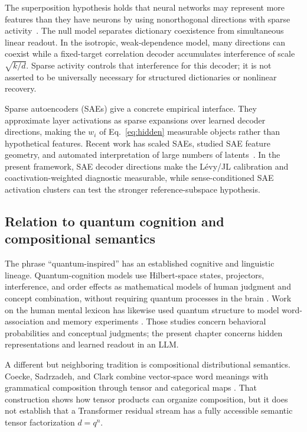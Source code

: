 \documentclass[
  aps,
  reprint,
  superscriptaddress,
  floatfix,
  nofootinbib,
  longbibliography
]{revtex4-2}
\begin{document}
The superposition hypothesis holds that neural networks may represent more
features than they have neurons by using nonorthogonal directions with sparse
activity~\cite{elhage2022superposition,bricken2023monosemanticity}.  The null
model separates dictionary coexistence from simultaneous linear readout.  In
the isotropic, weak-dependence model, many directions can coexist while a
fixed-target correlation decoder accumulates interference of scale
$\sqrt{k/d}$.  Sparse activity controls that interference for this decoder;
it is not asserted to be universally necessary for structured dictionaries or
nonlinear recovery.

Sparse autoencoders (SAEs) give a concrete empirical interface. They
approximate layer activations as sparse expansions over learned decoder
directions, making the $w_i$ of Eq.~\eqref{eq:hidden} measurable
objects rather than hypothetical features. Recent work has scaled SAEs,
studied SAE feature geometry, and automated interpretation of large
numbers of latents~\cite{gao2025scaling,li2025geometry,paulo2025automatically,shu2025survey}. In the
present framework, SAE decoder directions make the L\'evy/JL calibration and
coactivation-weighted diagnostic measurable, while sense-conditioned SAE
activation clusters can test the stronger reference-subspace hypothesis.

\subsection{Relation to quantum cognition and compositional semantics}
\label{sec:related-quantum}

The phrase ``quantum-inspired'' has an established cognitive and linguistic
lineage.  Quantum-cognition models use Hilbert-space states, projectors,
interference, and order effects as mathematical models of human judgment and
concept combination, without requiring quantum processes in the brain
\cite{Busemeyer2012,aerts2005b}.  Work on the human mental lexicon has likewise
used quantum structure to model word-association and memory experiments
\cite{bruza2009lexicon}.  Those studies concern behavioral probabilities and
conceptual judgments; the present chapter concerns hidden representations and
learned readout in an LLM.

A different but neighboring tradition is compositional distributional
semantics.  Coecke, Sadrzadeh, and Clark combine vector-space word meanings
with grammatical composition through tensor and categorical maps
\cite{coecke2010compositional}.  That construction shows how tensor products
can organize composition, but it does not establish that a Transformer
residual stream has a fully accessible semantic tensor factorization
$d=q^n$.
\end{document}
